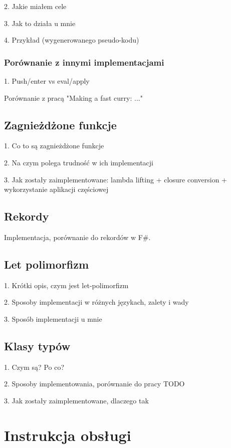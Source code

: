 \documentclass[declaration,shortabstract]{iithesis}
\begin{document}
2. Jakie miałem cele 

3. Jak to działa u mnie 

4. Przykład (wygenerowanego pseudo-kodu)

\subsection{Porównanie z innymi implementacjami}

1. Push/enter vs eval/apply

Porównanie z pracą "Making a fast curry: ..."

\section{Zagnieżdżone funkcje}

1. Co to są zagnieżdżone funkcje 

2. Na czym polega trudność w ich implementacji 

3. Jak zostały zaimplementowane: lambda lifting + closure conversion + 
wykorzystanie aplikacji częściowej

\section{Rekordy}

Implementacja, porównanie do rekordów w F\#.

\section{Let polimorfizm}

1. Krótki opis, czym jest let-polimorfizm

2. Sposoby implementacji w różnych językach, zalety i wady 

3. Sposób implementacji u mnie

\section{Klasy typów}

1. Czym są? Po co? 

2. Sposoby implementowania, porównanie do pracy TODO

3. Jak zostały zaimplementowane, dlaczego tak

\chapter{Instrukcja obsługi}
\end{document}
